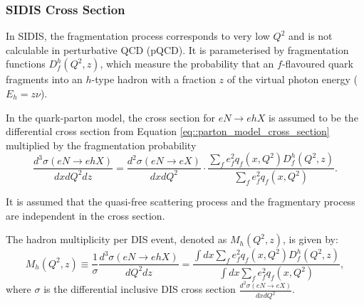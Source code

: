 \subsubsection{SIDIS Cross Section}
\label{sssec::sidis_cross_section}
    In SIDIS, the fragmentation process corresponds to very low $Q^2$ and is not calculable in perturbative QCD (pQCD).
    It is parameterised by fragmentation functions $D_f^h(Q^2, z)$, which measure the probability that an $f$-flavoured quark fragments into an $h$-type hadron with a fraction $z$ of the virtual photon energy ($E_h = z\nu$).

    In the quark-parton model, the cross section for $eN \rightarrow ehX$ is assumed to be the differential cross section from Equation \eqref{eq::parton_model_cross_section} multiplied by the fragmentation probability
    \begin{equation}
        \label{eq::fragmentation_probability}
        \frac{d^3\sigma(eN \rightarrow ehX)}{dxdQ^2dz} =
            \frac{d^2\sigma(eN \rightarrow eX)}{dxdQ^2} \cdot
            \frac{\sum_f e^2_f q_f(x,Q^2) D^h_f(Q^2,z)}{\sum_f e^2_f q_f(x,Q^2)}.
    \end{equation}

    It is assumed that the quasi-free scattering process and the fragmentary process are independent in the cross section.

    The hadron multiplicity per DIS event, denoted as $M_h(Q^2, z)$, is given by:
    \begin{equation*}
        M_h(Q^2,z) \equiv \frac{1}{\sigma} \frac{d^3\sigma(eN \rightarrow ehX)}{dQ^2dz} = \frac{\int dx \sum_f e^2_f q_f(x,Q^2) D^h_f(Q^2,z)}{\int dx \sum_f e^2_f q_f(x,Q^2)},
    \end{equation*}
    where $\sigma$ is the differential inclusive DIS cross section $\frac{d^2\sigma(eN \rightarrow eX)}{dxdQ^2}$.

